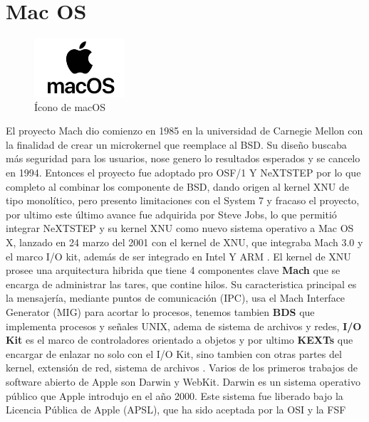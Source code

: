 
\section{Mac OS}
\begin{figure}[H]
    \centering
    \includegraphics[width=0.3\textwidth]{figures/macOS.png}
    \caption[Ícono de macOS]%
            {Ícono de macOS \citep{GQInfo_macOS}}
    \label{fig:sistema_operativo_mac_os}
\end{figure}
El proyecto Mach dio comienzo en 1985 en la universidad de Carnegie Mellon con la finalidad de crear un microkernel que reemplace al BSD. Su diseño buscaba más seguridad para los usuarios, nose genero lo resultados esperados y se cancelo en 1994. Entonces el proyecto fue adoptado pro OSF/1 Y NeXTSTEP por lo que completo al combinar los componente de BSD, dando origen al kernel XNU de tipo monolítico, pero presento limitaciones con el System 7 y fracaso el proyecto, por ultimo este último avance fue adquirida por Steve Jobs, lo que permitió integrar NeXTSTEP y su kernel XNU como nuevo sistema operativo a Mac OS X, lanzado en 24 marzo del 2001 con el kernel de XNU, que integraba Mach 3.0 y el marco I/O kit, además de ser integrado en Intel Y ARM \citep{Keuper2012}.
El kernel de XNU prosee una arquitectura hibrida que tiene 4 componentes clave \textbf{Mach} que se encarga de administrar las tares, que contine hilos. Su caracteristica principal es la mensajería, mediante puntos de comunicación (IPC), usa el Mach Interface Generator (MIG) para acortar lo procesos, tenemos tambien \textbf{BDS} que implementa procesos y señales UNIX, adema de sistema de archivos y redes, \textbf{I/O Kit} es el marco de controladores orientado a objetos y por ultimo \textbf{KEXTs}  que encargar de enlazar  no solo con el I/O Kit, sino tambien con otras partes del kernel, extensión de red, sistema de archivos \citep{Levin2007}.
Varios de los primeros trabajos de software abierto de Apple son Darwin y WebKit. Darwin es un sistema operativo público que Apple introdujo en el año 2000. Este sistema fue liberado bajo la Licencia Pública de Apple (APSL), que ha sido aceptada por la OSI y la FSF \citep{Levin2007}